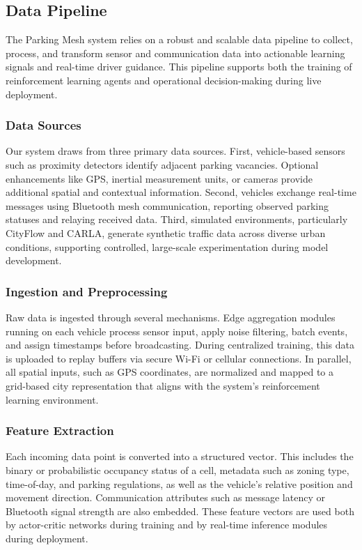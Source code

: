 \subsection{Data Pipeline}

The Parking Mesh system relies on a robust and scalable data pipeline to collect, process, and transform sensor and communication data into actionable learning signals and real-time driver guidance. This pipeline supports both the training of reinforcement learning agents and operational decision-making during live deployment.

\subsubsection{Data Sources}
Our system draws from three primary data sources. First, vehicle-based sensors such as proximity detectors identify adjacent parking vacancies. Optional enhancements like GPS, inertial measurement units, or cameras provide additional spatial and contextual information. Second, vehicles exchange real-time messages using Bluetooth mesh communication, reporting observed parking statuses and relaying received data. Third, simulated environments, particularly CityFlow and CARLA, generate synthetic traffic data across diverse urban conditions, supporting controlled, large-scale experimentation during model development.

\subsubsection{Ingestion and Preprocessing}
Raw data is ingested through several mechanisms. Edge aggregation modules running on each vehicle process sensor input, apply noise filtering, batch events, and assign timestamps before broadcasting. During centralized training, this data is uploaded to replay buffers via secure Wi-Fi or cellular connections. In parallel, all spatial inputs, such as GPS coordinates, are normalized and mapped to a grid-based city representation that aligns with the system’s reinforcement learning environment.

\subsubsection{Feature Extraction}
Each incoming data point is converted into a structured vector. This includes the binary or probabilistic occupancy status of a cell, metadata such as zoning type, time-of-day, and parking regulations, as well as the vehicle’s relative position and movement direction. Communication attributes such as message latency or Bluetooth signal strength are also embedded. These feature vectors are used both by actor-critic networks during training and by real-time inference modules during deployment.

